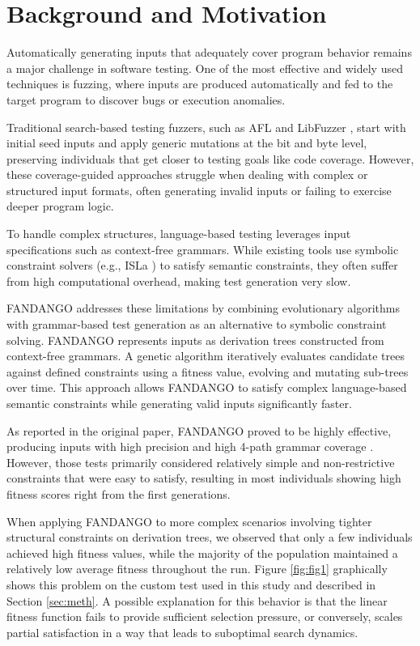 \documentclass[conference]{IEEEtran}
\begin{document}
\section{Background and Motivation}
Automatically generating inputs that adequately cover program behavior remains a major challenge in software testing. One of the most effective and widely used techniques is fuzzing, where inputs are produced automatically and fed to the target program to discover bugs or execution anomalies.

Traditional search-based testing \cite{mcminn2004survey, mcminn2011past}  fuzzers, such as AFL \cite{zalewski2014afl} and LibFuzzer \cite{llvm_libfuzzer}, start with initial seed inputs and apply generic mutations at the bit and byte level, preserving individuals that get closer to testing goals like code coverage. However, these coverage-guided approaches struggle when dealing with complex or structured input formats, often generating invalid inputs or failing to exercise deeper program logic.

To handle complex structures, language-based testing \cite{steinhofel2024language} leverages input specifications such as context-free grammars. While existing tools use symbolic constraint solvers (e.g., ISLa \cite{steinhofel2022input}) to satisfy semantic constraints, they often suffer from high computational overhead, making test generation very slow. 

FANDANGO addresses these limitations by combining evolutionary algorithms with grammar-based test generation as an alternative to symbolic constraint solving. FANDANGO represents inputs as derivation trees constructed from context-free grammars. A genetic algorithm iteratively evaluates candidate trees against defined constraints using a fitness value, evolving and mutating sub-trees over time. This approach allows FANDANGO to satisfy complex language-based semantic constraints while generating valid inputs significantly faster.

As reported in the original paper, FANDANGO proved to be highly effective, producing inputs with high precision and high 4-path grammar coverage \cite{havrikov2019systematically}. However, those tests primarily considered relatively simple and non-restrictive constraints that were easy to satisfy, resulting in most individuals showing high fitness scores right from the first generations.

When applying FANDANGO to more complex scenarios involving tighter structural constraints on derivation trees, we observed that only a few individuals achieved high fitness values, while the majority of the population maintained a relatively low average fitness throughout the run.
Figure \ref{fig:fig1} graphically shows this problem on the custom test used in this study and described in Section \ref{sec:meth}. A possible explanation for this behavior is that the linear fitness function fails to provide sufficient selection pressure, or conversely, scales partial satisfaction in a way that leads to suboptimal search dynamics.
\end{document}
